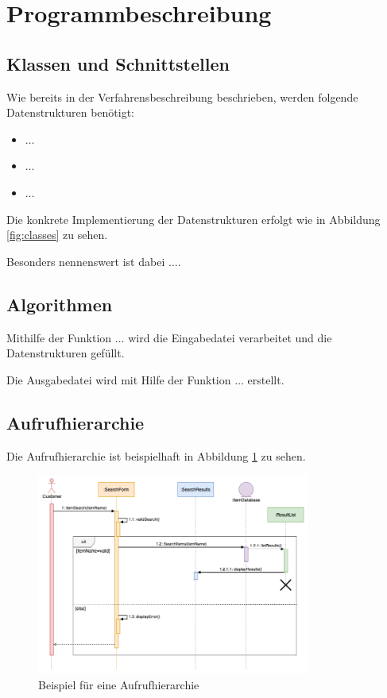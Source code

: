 \section{Programmbeschreibung}
\label{sec:programmbeschreibung}


\subsection{Klassen und Schnittstellen}
\label{ssec:klassen_und_schnittstellen}

Wie bereits in der Verfahrensbeschreibung beschrieben, werden folgende Datenstrukturen benötigt:

\begin{itemize}
    \item $\ldots$
    \item $\ldots$
    \item $\ldots$
\end{itemize}

Die konkrete Implementierung der Datenstrukturen erfolgt wie in Abbildung \ref{fig:classes} zu sehen.


Besonders nennenswert ist dabei $\ldots$.

\subsection{Algorithmen}
\label{ssec:algorithmen}

Mithilfe der Funktion $\ldots$ wird die Eingabedatei verarbeitet und die Datenstrukturen gefüllt.

Die Ausgabedatei wird mit Hilfe der Funktion $\ldots$ erstellt.

\subsection{Aufrufhierarchie}
\label{ssec:aufrufhierarchie}

Die Aufrufhierarchie ist beispielhaft in Abbildung \ref{fig:example_sequence_diagram} zu sehen.

\begin{figure}[H]
    \centering
    \includegraphics[width=0.8\textwidth]{figures/example_sequence_diagram.png}
    \caption{Beispiel für eine Aufrufhierarchie}
    \label{fig:example_sequence_diagram}
\end{figure}